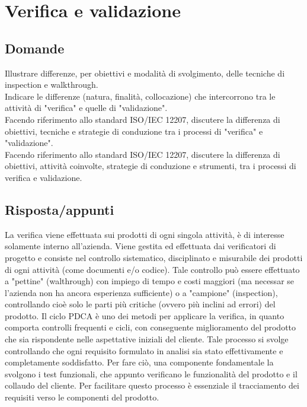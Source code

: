 \section{Verifica e validazione}

\subsection*{Domande}

Illustrare differenze, per obiettivi e modalità di svolgimento, delle tecniche di inspection e walkthrough.\\

Indicare le differenze (natura, finalità, collocazione) che intercorrono tra le attività di "verifica" e quelle di "validazione".\\

Facendo riferimento allo standard ISO/IEC 12207, discutere la differenza di obiettivi, tecniche e strategie di conduzione tra i processi di "verifica" e "validazione".\\

Facendo riferimento allo standard ISO/IEC 12207, discutere la differenza di obiettivi, attività coinvolte, strategie di conduzione e strumenti, tra i processi di verifica e validazione.\\


\subsection*{Risposta/appunti}
La verifica viene effettuata sui prodotti di ogni singola attività, è di interesse solamente interno all'azienda. Viene gestita
ed effettuata dai verificatori di progetto e consiste nel controllo sistematico, disciplinato e misurabile dei prodotti di
ogni attività (come documenti e/o codice). Tale controllo può essere effettuato a "pettine" (walthrough) con impiego di
tempo e costi maggiori (ma necessar se l'azienda non ha ancora esperienza sufficiente) o a "campione" (inspection),
controllando cioè solo le parti più critiche (ovvero più inclini ad errori) del prodotto.
Il ciclo PDCA è uno dei metodi per applicare la verifica, in quanto comporta controlli frequenti e cicli, con conseguente
miglioramento del prodotto che sia rispondente nelle aspettative iniziali del cliente. Tale processo si svolge controllando
che ogni requisito formulato in analisi sia stato effettivamente e completamente soddisfatto. Per fare ciò, una
componente fondamentale la svolgono i test funzionali, che appunto verificano le funzionalità del prodotto e il collaudo
del cliente. Per facilitare questo processo è essenziale il tracciamento dei requisiti verso le componenti del prodotto. 


